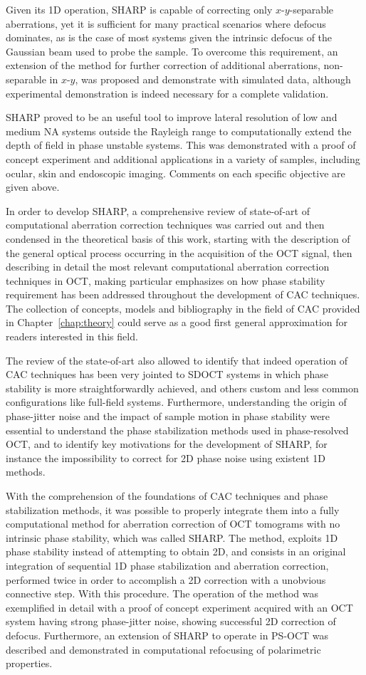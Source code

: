 Given its 1D operation, SHARP is capable of correcting only $x$-$y$-separable aberrations, yet it is sufficient for many practical scenarios where defocus dominates, as is the case of most systems given the intrinsic defocus of the Gaussian beam used to probe the sample. To overcome this requirement, an extension of the method for further correction of additional aberrations, non-separable in $x$-$y$, was proposed and demonstrate with simulated data, although experimental demonstration is indeed necessary for a complete validation.

SHARP proved to be an useful tool to improve lateral resolution of low and medium NA systems outside the Rayleigh range to computationally extend the depth of field in phase unstable systems. This was demonstrated with a proof of concept experiment and additional applications in a variety of samples, including ocular, skin and endoscopic imaging. Comments on each specific objective are given above.

In order to develop SHARP, a comprehensive review of state-of-art of computational aberration correction techniques was carried out and then condensed in the theoretical basis of this work, starting with the description of the general optical process occurring in the acquisition of the OCT signal, then describing in detail the most relevant computational aberration correction techniques in OCT, making particular emphasizes on how phase stability requirement has been addressed throughout the development of CAC techniques. The collection of concepts, models and bibliography in the field of CAC provided in Chapter~\ref{chap:theory} could serve as a good first general approximation for readers interested in this field.

The review of the state-of-art also allowed to identify that indeed operation of CAC techniques has been very jointed to SDOCT systems in which phase stability is more straightforwardly achieved, and others custom and less common configurations like full-field systems. Furthermore, understanding the origin of phase-jitter noise and the impact of sample motion in phase stability were essential to understand the phase stabilization methods used in phase-resolved OCT, and to identify key motivations for the development of SHARP, for instance the impossibility to correct for 2D phase noise using existent 1D methods.

With the comprehension of the foundations of CAC techniques and phase stabilization methods, it was possible to properly integrate them into a fully computational method for aberration correction of OCT tomograms with no intrinsic phase stability, which was called SHARP. The method, exploits 1D phase stability instead of attempting to obtain 2D, and consists in an original integration of sequential 1D phase stabilization and aberration correction, performed twice in order to accomplish a 2D correction with a unobvious connective step. With this procedure. The operation of the method was exemplified in detail with a proof of concept experiment acquired with an OCT system having strong phase-jitter noise, showing successful 2D correction of defocus. Furthermore, an extension of SHARP to operate in PS-OCT was described and demonstrated in computational refocusing of polarimetric properties.


